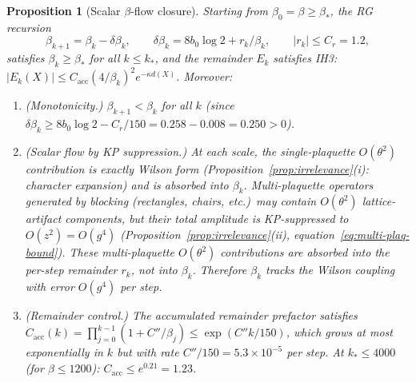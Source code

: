 \documentclass[11pt]{article}
\newtheorem{proposition}[theorem]{Proposition}
\theoremstyle{definition}
\begin{document}
\begin{proposition}[Scalar $\beta$-flow closure]%
\label{prop:beta-flow}
Starting from $\beta_0=\beta\ge\beta_*$, the RG recursion
\begin{equation}\label{eq:beta-recursion}
\beta_{k+1}=\beta_k-\delta\beta_k,\qquad
\delta\beta_k=8b_0\log 2+r_k/\beta_k,\qquad
|r_k|\le C_r=1.2,
\end{equation}
satisfies $\beta_k\ge\beta_*$ for all $k\le k_*$, and the
remainder $E_k$ satisfies IH3:
$|E_k(X)|\le C_{\mathrm{acc}}(4/\beta_k)^2 e^{-\kappa d(X)}$.
Moreover:
\begin{enumerate}[nosep,label=(\roman*)]
\item \emph{(Monotonicity.)} $\beta_{k+1}<\beta_k$ for all $k$
(since $\delta\beta_k\ge 8b_0\log 2-C_r/150=0.258-0.008=0.250>0$).
\item \emph{(Scalar flow by KP suppression.)}
At each scale, the single-plaquette $O(\theta^2)$ contribution
is exactly Wilson form
(Proposition~\ref{prop:irrelevance}(i): character expansion)
and is absorbed into $\beta_k$.  Multi-plaquette operators
generated by blocking (rectangles, chairs, etc.)\ may
contain $O(\theta^2)$ lattice-artifact components, but their
total amplitude is KP-suppressed to $O(z^2)=O(g^4)$
(Proposition~\ref{prop:irrelevance}(ii),
equation~\eqref{eq:multi-plaq-bound}).  These multi-plaquette
$O(\theta^2)$ contributions are absorbed into the per-step
remainder $r_k$, not into $\beta_k$.  Therefore $\beta_k$
tracks the Wilson coupling with error $O(g^4)$ per step.
\item \emph{(Remainder control.)} The accumulated remainder
prefactor satisfies
$C_{\mathrm{acc}}(k)=\prod_{j=0}^{k-1}(1+C''/\beta_j)
\le\exp(C'' k/150)$,
which grows at most exponentially in $k$ but with rate
$C''/150=5.3\times 10^{-5}$ per step.  At $k_*\le 4000$
(for $\beta\le 1200$):
$C_{\mathrm{acc}}\le e^{0.21}=1.23$.
\end{enumerate}
\end{proposition}
\end{document}
